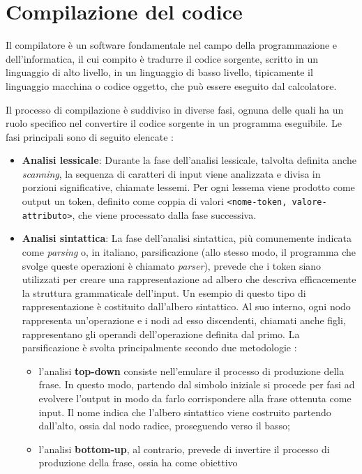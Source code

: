 \documentclass[12pt,a4paper,openright,twoside]{book}
\begin{document}
\section{Compilazione del codice}
Il compilatore è un software fondamentale nel campo della programmazione e dell’informatica, il cui compito è tradurre il codice sorgente, 
scritto in un linguaggio di alto livello, in un linguaggio di basso livello, tipicamente il linguaggio macchina o codice oggetto, che può 
essere eseguito 
dal calcolatore.

Il processo di compilazione è suddiviso in diverse fasi, ognuna delle quali ha un ruolo specifico nel convertire il codice sorgente in un 
programma eseguibile. Le fasi principali sono di seguito elencate \cite{Aho2006}:
\begin{itemize}
    \item \textbf{Analisi lessicale}: Durante la fase dell'analisi lessicale, talvolta definita anche \textit{scanning}, la sequenza di 
    caratteri di input viene analizzata e divisa in porzioni significative, chiamate lessemi. Per ogni lessema viene prodotto come output un 
    token, definito come coppia di valori \texttt{<nome-token, valore-attributo>}, che viene processato dalla fase successiva.
    \item \textbf{Analisi sintattica}: La fase dell'analisi sintattica, più comunemente indicata come \textit{parsing} o, in italiano, 
    parsificazione (allo stesso modo, il programma che svolge queste operazioni è chiamato \textit{parser}), prevede che i token siano 
    utilizzati per creare una rappresentazione ad albero che descriva efficacemente la struttura grammaticale dell'input. Un esempio di 
    questo tipo di rappresentazione è costituito dall'albero sintattico. Al suo interno, ogni nodo rappresenta un'operazione e i nodi ad 
    esso discendenti, chiamati anche figli, rappresentano gli operandi dell'operazione definita dal primo. La parsificazione è svolta 
    principalmente secondo due metodologie \cite{Grune2006}:
    \begin{itemize}
        \item l’analisi \textbf{top-down} consiste nell'emulare il processo di produzione della frase. In questo modo, partendo dal simbolo 
        iniziale si procede per fasi ad evolvere l'output in modo da farlo corrispondere alla frase ottenuta come input. Il nome indica che 
        l'albero sintattico viene costruito partendo dall'alto, ossia dal nodo radice, proseguendo verso il basso;
        \item l’analisi \textbf{bottom-up}, al contrario, prevede di invertire il processo di produzione della frase, ossia ha come obiettivo 

\end{itemize}
\end{itemize}
\end{document}
